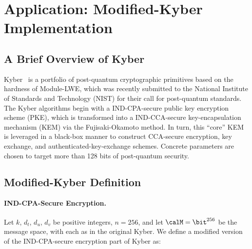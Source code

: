
\section{Application: Modified-Kyber Implementation}
\label{sec:modif-kyber-inst}

\subsection{A Brief Overview of Kyber}
\label{sec:kyber-intro}

Kyber~\cite{DBLP:journals/iacr/BosDKLLSSS17} is a portfolio of post-quantum cryptographic primitives based on the hardness of Module-LWE, which was recently submitted to the National Institute of Standards and Technology (NIST) for their call for post-quantum standards. The Kyber algorithms begin with a IND-CPA-secure public key encryption scheme (PKE), which is transformed into a IND-CCA-secure key-encapsulation mechanism (KEM) via the Fujisaki-Okamoto method. In turn, this ``core'' KEM is leveraged in a black-box manner to construct CCA-secure encryption, key exchange, and authenticated-key-exchange schemes. Concrete parameters are chosen to target more than 128 bits of post-quantum security.

\subsection{Modified-Kyber Definition}
\label{sec:modif-kyber-defin}

\paragraph{IND-CPA-Secure Encryption.} Let $k$, $d_t$, $d_u$, $d_v$ be positive integers, $n=256$, and let $\calM = \bit^{256}$ be the message space, with each as in the original Kyber. We define a modified version of the IND-CPA-secure encryption part of Kyber as:

